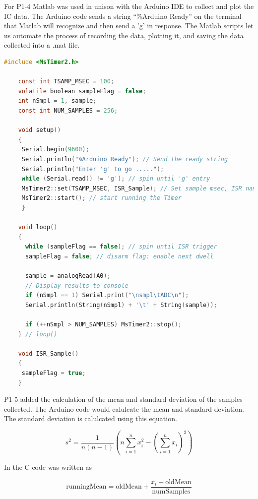 \documentclass[journal]{IEEEtran}
\begin{document}
For P1-4 Matlab was used in unison with the Arduino IDE to collect and plot the IC data. The Arduino code sends a string “\%Arduino Ready” on the terminal that Matlab will recognize and then send a 'g' in response. The Matlab scripts let us automate the process of recording the data, plotting it, and saving the data collected into a .mat file.

\begin{lstlisting}[language=c]
    #include <MsTimer2.h>

    const int TSAMP_MSEC = 100;
    volatile boolean sampleFlag = false;
    int nSmpl = 1, sample;
    const int NUM_SAMPLES = 256;
    
    void setup()
    {
     Serial.begin(9600);
     Serial.println("%Arduino Ready"); // Send the ready string
     Serial.println("Enter 'g' to go .....");
     while (Serial.read() != 'g'); // spin until 'g' entry
     MsTimer2::set(TSAMP_MSEC, ISR_Sample); // Set sample msec, ISR name
     MsTimer2::start(); // start running the Timer
     }
    
    void loop()
    {
      while (sampleFlag == false); // spin until ISR trigger
      sampleFlag = false; // disarm flag: enable next dwell
      
      sample = analogRead(A0);
      // Display results to console
      if (nSmpl == 1) Serial.print("\nsmpl\tADC\n");
      Serial.println(String(nSmpl) + '\t' + String(sample));
      
      if (++nSmpl > NUM_SAMPLES) MsTimer2::stop();
    } // loop()
    
    void ISR_Sample() 
    {
     sampleFlag = true;
    }
\end{lstlisting}

P1-5 added the calculation of the mean and standard deviation of the samples collected. The Arduino code would calulcate the mean and standard deviation. The standard deviation is calulcated using this equation.

\begin{equation}
    s^2 = \frac{1}{n(n-1)} \left( n \sum_{i=1}^{n} x_i^2 - \left( \sum_{i=1}^{n} x_i \right)^2 \right)
\end{equation}

In the C code was written as

\begin{equation*}
    \text{runningMean} = \text{oldMean} + \frac{x_i - \text{oldMean}}{\text{numSamples}}
\end{equation*}
\end{document}
